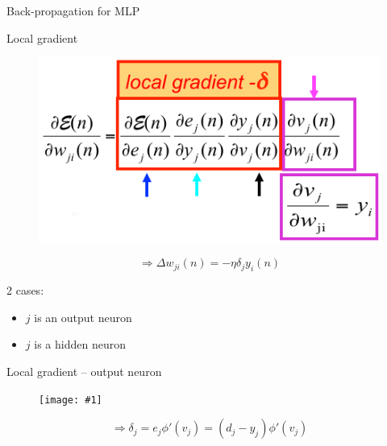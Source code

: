 \documentclass[9pt,t]{beamer}
\newcommand{\picEqHereWidth}[2] { %
    \begin{figure}[htp] 
        \centering
        \texttt{[image: \#1]}
    \end{figure}
}
\begin{document}
\begin{frame}{Back-propagation for MLP}
    \begin{alertblock}{Local gradient}
        \begin{figure}
            \centering
            \includegraphics[width=0.9\linewidth]{mlp_bp_breakdown}
        \end{figure}
        \[ \Rightarrow \Delta w_{ji}(n) = -\eta \delta_j y_i(n) \]

        2 cases:
        \begin{itemize}
            \item $ j $ is an output neuron
            \item $ j $ is a hidden neuron
        \end{itemize}
    \end{alertblock}
    \begin{alertblock}{Local gradient -- output neuron}
        \picEqHereWidth{mlp_bp_localgrad_1}{0.6\linewidth}
        \[ \Rightarrow \delta_j = e_j \phi'(v_j) = (d_j - y_j) \phi'(v_j) \]
    \end{alertblock}
\end{frame}
\end{document}
